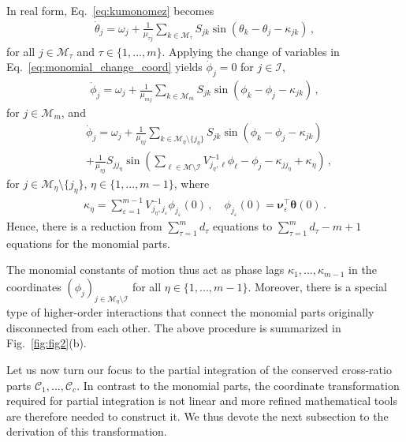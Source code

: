 \documentclass[aps,pre,reprint,longbibliography,superscriptaddress,noshowpacs,floatfix]{revtex4-2}
\theoremstyle{definition}
\theoremstyle{remark}
\begin{document}
In real form, Eq.~\eqref{eq:kumonomez} becomes
\begin{align}\label{eq:kumonome}
    \dot{\theta}_j = \omega_j + \frac{1}{\mu_{\tau j}} \sum_{k\in\mathcal{M}_{\tau}}S_{jk} \sin(\theta_k - \theta_j - \kappa_{jk})\,,
\end{align}
for all $j\in\mathcal{M}_\tau$ and $\tau\in\{1,...,m\}$. Applying the change of variables in Eq.~\eqref{eq:monomial_change_coord} yields $\dot{\phi}_j = 0$ for $j\in\mathcal{I}$,
\begin{align}
    \dot{\phi}_j = \omega_j + \frac{1}{\mu_{m j}} \sum_{k\in\mathcal{M}_{m}}S_{jk} \sin(\phi_k - \phi_j - \kappa_{jk})\,,
\end{align}
for $j\in\mathcal{M}_m$, and
\begin{align}
    &\dot{\phi}_j = \omega_j + \frac{1}{\mu_{\eta j}} \sum_{k\in\mathcal{M}_{\eta}\setminus \{j_\eta\}}S_{jk} \sin(\phi_k - \phi_j - \kappa_{jk}) \nonumber
    \\&+ \frac{1}{\mu_{\eta j}} S_{jj_\eta } \sin(\textstyle{\sum_{\ell \in \mathcal{M}\setminus\mathcal{I}}}V^{-1}_{j_\eta, \ell}\phi_\ell - \phi_j - \kappa_{jj_\eta} + \kappa_{\eta})\,,
\end{align}
for $j \in \mathcal{M}_{\eta}\setminus\{j_\eta\}$, $\eta\in\{1,...,m-1\}$, where 
\begin{align}\label{eq:kappa_cte_mvt}
    \kappa_{\eta} %
    = \sum_{\varepsilon = 1}^{m-1}V^{-1}_{j_\eta, j_\varepsilon}\phi_{j_\varepsilon}(0)\,,\quad \phi_{j_\varepsilon}(0) = \bm\nu_\varepsilon^\top \bm{\theta}(0)\,.
\end{align}
Hence, there is a reduction from $\sum_{\tau = 1}^m d_\tau$ equations to $\sum_{\tau = 1}^m d_\tau - m + 1$ equations for the monomial parts.

The monomial constants of motion thus act as phase lags $\kappa_1, ...,\kappa_{m-1}$ in the coordinates $(\phi_j)_{j \in \mathcal{M}_{\eta}\setminus\mathcal{I}}$ for all $\eta\in\{1,...,m-1\}$. Moreover, there is a special type of higher-order interactions that connect the monomial parts originally disconnected from each other. The above procedure is summarized in Fig.~\ref{fig:fig2}(b).

Let us now turn our focus to the partial integration of the conserved cross-ratio parts $\mathcal{C}_1, ..., \mathcal{C}_c$. In contrast to the monomial parts, the coordinate transformation required for partial integration is not linear and more refined mathematical tools are therefore needed to construct it. We thus devote the next subsection to the derivation of this transformation.
\end{document}
